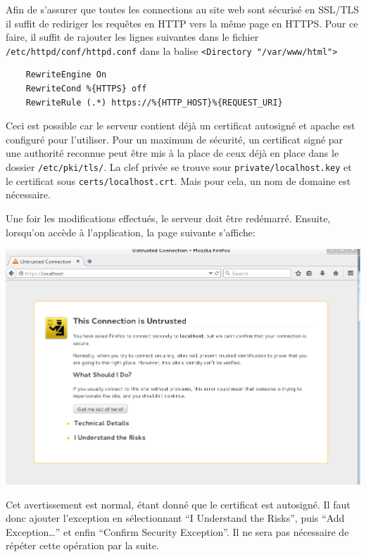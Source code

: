 \documentclass{article}
\begin{document}
Afin de s'assurer que toutes les connections au site web sont sécurisé
en SSL/TLS il suffit de rediriger les requêtes en HTTP vers la même page
en HTTPS. Pour ce faire, il suffit de rajouter les lignes suivantes dans
le fichier \texttt{/etc/httpd/conf/httpd.conf} dans la balise
\texttt{\textless{}Directory\ "/var/www/html"\textgreater{}}

\begin{verbatim}
    RewriteEngine On
    RewriteCond %{HTTPS} off
    RewriteRule (.*) https://%{HTTP_HOST}%{REQUEST_URI}
\end{verbatim}

Ceci est possible car le serveur contient déjà un certificat autosigné
et apache est configuré pour l'utiliser. Pour un maximum de sécurité, un
certificat signé par une authorité reconnue peut être mis à la place de
ceux déjà en place dans le dossier \texttt{/etc/pki/tls/}. La clef
privée se trouve sour \texttt{private/localhost.key} et le certificat
sous \texttt{certs/localhost.crt}. Mais pour cela, un nom de domaine est
nécessaire.

Une foir les modifications effectués, le serveur doit être redémarré.
Ensuite, lorsqu'on accède à l'application, la page suivante s'affiche:

\includegraphics{images/ssl.PNG}

Cet avertissement est normal, étant donné que le certificat est
autosigné. Il faut donc ajouter l'exception en sélectionnant ``I
Understand the Risks'', puis ``Add Exception\ldots{}'' et enfin
``Confirm Security Exception''. Il ne sera pas nécessaire de répéter
cette opération par la suite.
\end{document}
